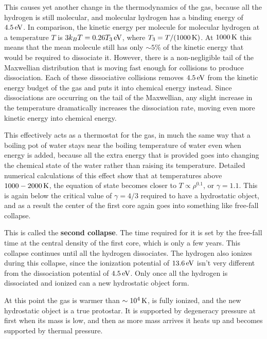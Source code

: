 \documentclass[a4paper,10pt]{article}
\begin{document}
{\noindent}This causes yet another change in the thermodynamics of the gas, because all the hydrogen is still molecular, and molecular hydrogen has a binding energy of $4.5\,{\rm eV}$. In comparison, the kinetic energy per molecule for molecular hydrogen at a temperature $T$ is $3k_BT=0.26T_3\,{\rm eV}$, where $T_3=T/(1000\,{\rm K})$. At $1000\,{\rm K}$ this means that the mean molecule still has only $\sim5\%$ of the kinetic energy that would be required to dissociate it. However, there is a non-negligible tail of the Maxwellian distribution that is moving fast enough for collisions to produce dissociation. Each of these dissociative collisions removes $4.5\,{\rm eV}$ from the kinetic energy budget of the gas and puts it into chemical energy instead. Since dissociations are occurring on the tail of the Maxwellian, any slight increase in the temperature dramatically increases the dissociation rate, moving even more kinetic energy into chemical energy.

{\noindent}This effectively acts as a thermostat for the gas, in much the same way that a boiling pot of water stays near the boiling temperature of water even when energy is added, because all the extra energy that is provided goes into changing the chemical state of the water rather than raising its temperature. Detailed numerical calculations of this effect show that at temperatures above $1000-2000\,{\rm K}$, the equation of state becomes closer to $T\propto\rho^{0.1}$, or $\gamma=1.1$. This is again below the critical value of $\gamma=4/3$ required to have a hydrostatic object, and as a result the center of the first core again goes into something like free-fall collapse.

{\noindent}This is called the \textbf{second collapse}. The time required for it is set by the free-fall time at the central density of the first core, which is only a few years. This collapse continues until all the hydrogen dissociates. The hydrogen also ionizes during this collapse, since the ionization potential of $13.6\,{\rm eV}$ isn't very different from the dissociation potential of $4.5\,{\rm eV}$. Only once all the hydrogen is dissociated and ionized can a new hydrostatic object form.

{\noindent}At this point the gas is warmer than $\sim10^4\,{\rm K}$, is fully ionized, and the new hydrostatic object is a true protostar. It is supported by degeneracy pressure at first when its mass is low, and then as more mass arrives it heats up and becomes supported by thermal pressure.
\end{document}
